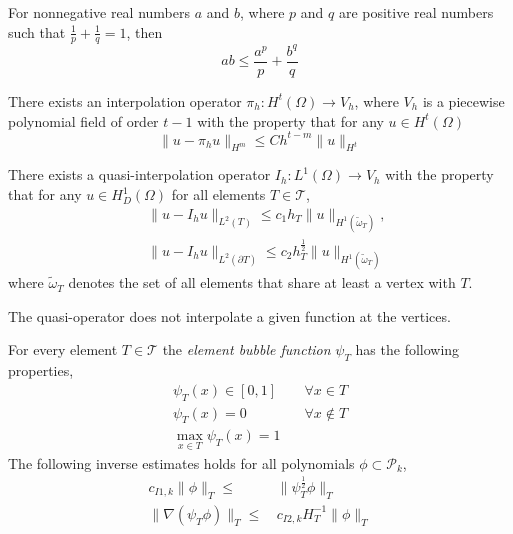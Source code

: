 \begin{theorem} \label{def:young}
For nonnegative real numbers $a$ and $b$, where $p$ and $q$ are positive real numbers such that $\frac{1}{p} + \frac{1}{q} = 1$, then
\begin{equation}
ab \leq \frac{a^p}{p} + \frac{b^q }{q}
\end{equation}
\end{theorem}

\begin{theorem} \label{def:approx}
There exists an interpolation operator $\pi_h : H^t(\Omega) \rightarrow V_h$, where $V_h$ is a piecewise polynomial field of order $t-1$ with the property that for any $u \in H^t(\Omega)$
\begin{equation}
\|u - \pi_h u \|_{H^m} \leq C h^{t-m}\| u\|_{H^t}
\end{equation}
\end{theorem}

\begin{theorem} \label{def:interpol}
There exists a quasi-interpolation operator $I_h : L^1(\Omega) \rightarrow V_h$ with the property that for any $u \in H^1_D(\Omega)$ for all elements $T\in \mathcal{T}$,
\begin{align*}
& \, \|u - I_h u \|_{L^2(T)} \leq c_1 h_T \|u\|_{H^1(\tilde{\omega}_T)},\\
& \, \|u - I_h u \|_{L^2(\partial T)} \leq c_2 h_T^{\frac{1}{2}} \|u\|_{H^1(\tilde{\omega}_T)}
\end{align*}
where $\tilde{\omega}_T$ denotes the set of all elements that share at least a vertex with $T$. 
\end{theorem}
\begin{remark}
The quasi-operator does not interpolate a given function at the vertices. 
\end{remark}

\begin{definition} \label{def:bubble_est}
For every element $T \in \mathcal{T}$ the \textit{element bubble function} $\psi_T$ has the following properties,
\begin{align*}
\psi_T(x) \in  [0,1] \quad & \,\forall x \in T \\
\psi_T(x) =  0 \quad & \, \forall x \notin T \\
\max_{x \in T} \psi_T(x) = 1 
\end{align*}
The following inverse estimates holds for all polynomials $\phi \subset \mathcal{P}_k$,
\begin{align*}
c_{I1,k}\|\phi \|_T \leq & \, \|\psi_T^{\frac{1}{2}}\phi\|_T \\
\|\nabla(\psi_T\phi) \|_T \leq & \, c_{I2,k}H_T^{-1}\|\phi\|_T
\end{align*}
\end{definition}

